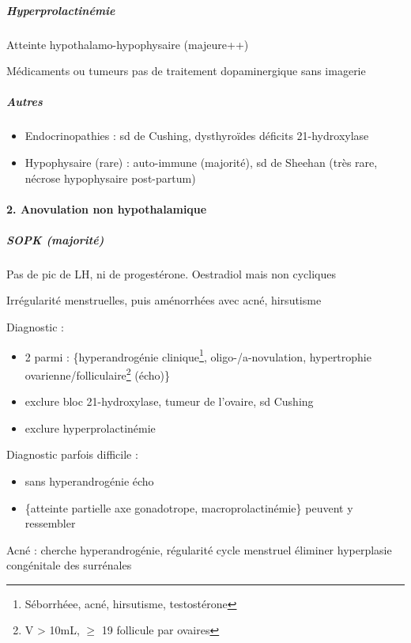 \documentclass[11pt]{article}
\begin{document}
\subparagraph{Hyperprolactinémie}
\label{sec:org7402127}
Atteinte hypothalamo-hypophysaire (majeure++)

Médicaments ou tumeurs \thus pas de traitement dopaminergique sans imagerie \danger

\subparagraph{Autres}
\label{sec:org2f3ce71}
\begin{itemize}
\item Endocrinopathies : sd de Cushing, dysthyroïdes déficits 21-hydroxylase
\item Hypophysaire (rare) : auto-immune (majorité), sd de Sheehan (très rare, nécrose hypophysaire post-partum)
\end{itemize}

\paragraph{2. Anovulation non hypothalamique}
\label{sec:org9691d2e}
\subparagraph{SOPK (majorité)}
\label{sec:orgd508f6a}
Pas de pic de LH, ni de progestérone. Oestradiol mais non cycliques

Irrégularité menstruelles, puis aménorrhées avec acné, hirsutisme

Diagnostic :
\begin{itemize}
\item 2 parmi : \{hyperandrogénie clinique\footnote{Séborrhéee, acné, hirsutisme, \inc testostérone}, oligo-/a-novulation, hypertrophie
ovarienne/folliculaire\footnote{V > 10mL, \(\ge\) 19 follicule par ovaires} (écho)\}
\item exclure bloc 21-hydroxylase, tumeur de l'ovaire, sd Cushing
\item exclure hyperprolactinémie
\end{itemize}

Diagnostic parfois difficile :
\begin{itemize}
\item sans hyperandrogénie \thus écho
\item \{atteinte partielle axe gonadotrope, macroprolactinémie\} peuvent y ressembler
\end{itemize}

Acné : cherche hyperandrogénie, régularité cycle menstruel \thus éliminer
hyperplasie congénitale des surrénales
\end{document}
